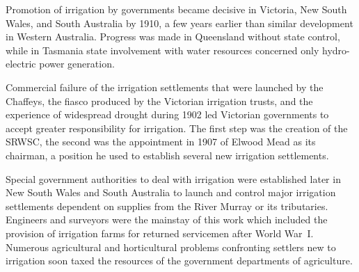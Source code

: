 \closure
Promotion of irrigation by governments became decisive in Victoria,
New South Wales, and South Australia by 1910, a few years earlier than
similar development in Western Australia.  Progress was made in
Queensland without state control, while in Tasmania state involvement
with water resources concerned only hydro-electric power generation.

Commercial failure of the irrigation settlements that were launched by
the Chaffeys, the fiasco produced by the Victorian irrigation trusts,
and the experience of widespread drought during 1902
led Victorian governments to accept greater responsibility for
irrigation.  The first step was the creation of the SRWSC, the second
was the appointment in 1907 of Elwood Mead as its chairman, a position
he used to establish several new irrigation settlements.

Special government authorities to deal with irrigation were
established later in New South Wales and South Australia to launch and
control major irrigation settlements dependent on supplies from the
River Murray or its tributaries.  Engineers and surveyors were the
mainstay of this work which included the provision of irrigation farms
for returned servicemen after World War~I.  Numerous agricultural and
horticultural problems confronting settlers new to irrigation soon
taxed the resources of the government departments of agriculture.

